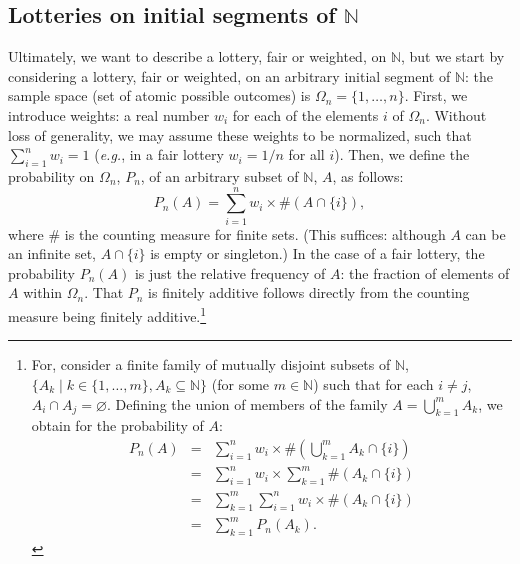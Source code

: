 \subsection{Lotteries on initial segments of $\mathbb{N}$}
Ultimately, we want to describe a lottery, fair or weighted, on $\mathbb{N}$, but we start by considering a lottery, fair or weighted, on an arbitrary initial segment of $\mathbb{N}$: the sample space (set of atomic possible outcomes) is $\Omega_n=\{1,\ldots,n\}$. First, we introduce weights: a real number $w_i$ for each of the elements $i$ of $\Omega_n$. Without loss of generality, we may assume these weights to be normalized, such that $\sum_{i=1}^{n} w_i=1$ (\textit{e.g.}, in a fair lottery $w_i=1/n$ for all $i$). Then, we define the probability on $\Omega_n$, $P_n$, of an arbitrary subset of $\mathbb{N}$, $A$, as follows:
$$ P_n(A)= \sum_{i=1}^{n}w_i \times \#(A \cap \{i\}), $$
where $\#$ is the counting measure for finite sets. (This suffices: although $A$ can be an infinite set, $A \cap \{i\}$ is empty or singleton.)
In the case of a fair lottery, the probability $P_n(A)$ is just the relative frequency of $A$: the fraction of elements of $A$ within $\Omega_n$.
That $P_n$ is finitely additive follows directly from the counting measure being finitely additive.\footnote{For, consider a finite family of mutually disjoint subsets of $\mathbb{N}$, $\{ A_k \mid k \in \{1,\ldots,m\}, A_k \subseteq \mathbb{N} \}$ (for some $m \in \mathbb{N}$) such that for each $i \neq j$, $A_i \cap A_j = \varnothing$. Defining the union of members of the family $A=\bigcup_{k=1}^{m}A_k$, we obtain for the probability of $A$:
$$
\begin{array}{lll}
P_n(A) & = & \sum_{i=1}^{n}w_i \times \#(\bigcup_{k=1}^{m}A_k \cap \{i\})
\\ & = & \sum_{i=1}^{n}w_i \times \sum_{k=1}^{m}\#(A_k \cap \{i\})
\\ & = & \sum_{k=1}^{m}\sum_{i=1}^{n}w_i \times \#(A_k \cap \{i\})
\\ & = & \sum_{k=1}^{m}P_n(A_k).
\end{array}
$$}

